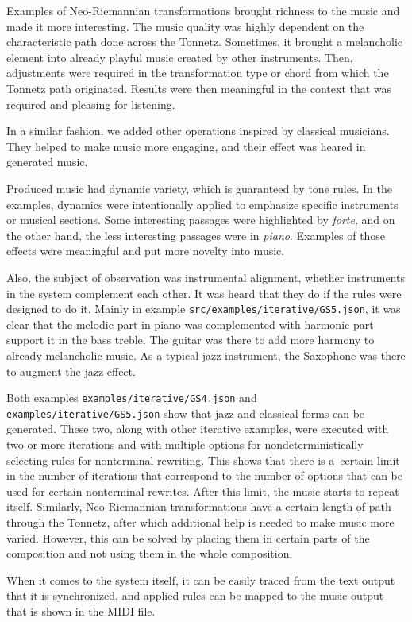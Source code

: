 Examples of Neo-Riemannian transformations brought richness to the music and made it more interesting. The music quality was highly dependent on the characteristic path done across the Tonnetz. Sometimes, it brought a melancholic element into already playful music created by other instruments. Then, adjustments were required in the transformation type or chord from which the Tonnetz path originated. Results were then meaningful in the context that was required and pleasing for listening.

In a similar fashion, we added other operations inspired by classical musicians. They helped to make music more engaging, and their effect was heared in generated music.

Produced music had dynamic variety, which is guaranteed by tone rules. In the examples, dynamics were intentionally applied to emphasize specific instruments or musical sections. Some interesting passages were highlighted by \textit{forte}, and on the other hand, the less interesting passages were in \textit{piano}. Examples of those effects were meaningful and put more novelty into music. 

Also, the subject of observation was instrumental alignment, whether instruments in the system complement each other. It was heard that they do if the rules were designed to do it. Mainly in example \texttt{src/examples/iterative/GS5.json}, it was clear that the melodic part in piano was complemented with harmonic part support it in the bass treble. The guitar was there to add more harmony to already melancholic music. As a typical jazz instrument, the Saxophone was there to augment the jazz effect.

Both examples \texttt{examples/iterative/GS4.json} and \texttt{examples/iterative/GS5.json} show that jazz and classical forms can be generated. These two, along with other iterative examples, were executed with two or more iterations and with multiple options for nondeterministically selecting rules for nonterminal rewriting. This shows that there is a~certain limit in the number of iterations that correspond to the number of options that can be used for certain nonterminal rewrites. After this limit, the music starts to repeat itself. Similarly, Neo-Riemannian transformations have a certain length of path through the Tonnetz, after which additional help is needed to make music more varied. However, this can be solved by placing them in certain parts of the composition and not using them in the whole composition.

When it comes to the system itself, it can be easily traced from the text output that it is synchronized, and applied rules can be mapped to the music output that is shown in the MIDI file.

